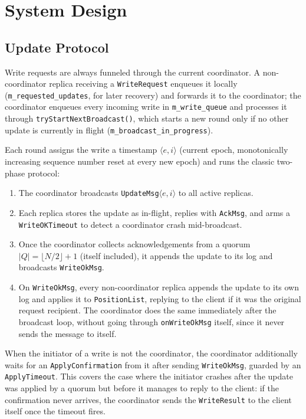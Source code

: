 \section{System Design}
\label{sec:design}

\subsection{Update Protocol}

Write requests are always funneled through the current coordinator. A non-coordinator replica
receiving a \texttt{WriteRequest} enqueues it locally (\texttt{m\_requested\_updates}, for later recovery) and forwards it to the coordinator; the coordinator enqueues every incoming write in
\texttt{m\_write\_queue} and processes it through \texttt{tryStartNextBroadcast()}, which starts a
new round only if no other update is currently in flight
(\texttt{m\_broadcast\_in\_progress}).

Each round assigns the write a timestamp $\langle e,i\rangle$ (current epoch, monotonically
increasing sequence number reset at every new epoch) and runs the classic two-phase protocol:

\begin{enumerate}[leftmargin=*]
  \item The coordinator broadcasts \texttt{UpdateMsg}$\langle e,i\rangle$ to all active replicas.
  \item Each replica stores the update as in-flight, replies with \texttt{AckMsg}, and arms a
  \texttt{WriteOKTimeout} to detect a coordinator crash mid-broadcast.
  \item Once the coordinator collects acknowledgements from a quorum
  $|Q| = \lfloor N/2 \rfloor + 1$ (itself included), it appends the update to its log and broadcasts
  \texttt{WriteOkMsg}.
  \item On \texttt{WriteOkMsg}, every non-coordinator replica appends the update to its own log
  and applies it to \texttt{PositionList}, replying to the client if it was the original request
  recipient. The coordinator does the same immediately after the broadcast loop, without going
  through \texttt{onWriteOkMsg} itself, since it never sends the message to itself.
\end{enumerate}

When the initiator of a write is not the coordinator, the coordinator additionally waits for an
\texttt{ApplyConfirmation} from it after sending \texttt{WriteOkMsg}, guarded by an
\texttt{ApplyTimeout}. This covers the case where the initiator crashes after the update was applied
by a quorum but before it manages to reply to the client: if the confirmation never arrives, the
coordinator sends the \texttt{WriteResult} to the client itself once the timeout fires.


